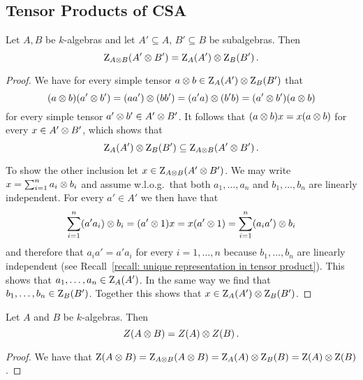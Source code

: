 \subsection{Tensor Products of CSA}


\begin{lemma}
  \label{lemma: centralizer componentwise}
  Let $A, B$ be $k$-algebras and let $A' \subseteq A$, $B' \subseteq B$ be subalgebras.
  Then
  \[
      \operatorname{Z}_{A \mathbin{\otimes} B}(A' \mathbin{\otimes} B')
    = \operatorname{Z}_A(A') \mathbin{\otimes} \operatorname{Z}_B(B') \,.
  \]
\end{lemma}


\begin{proof}
  We have for every simple tensor $a \mathbin{\otimes} b \in \operatorname{Z}_A(A') \mathbin{\otimes} \operatorname{Z}_B(B')$ that
  \[
      (a \mathbin{\otimes} b) (a' \mathbin{\otimes} b')
    = (aa') \mathbin{\otimes} (bb')
    = (a'a) \mathbin{\otimes} (b'b)
    = (a' \mathbin{\otimes} b')(a \mathbin{\otimes} b)
  \]
  for every simple tensor $a' \mathbin{\otimes} b' \in A' \mathbin{\otimes} B'$.
  It follows that $(a \mathbin{\otimes} b) x = x (a \mathbin{\otimes} b)$ for every $x \in A' \mathbin{\otimes} B'$, which shows that
  \[
              \operatorname{Z}_A(A') \mathbin{\otimes} \operatorname{Z}_B(B')
    \subseteq \operatorname{Z}_{A \mathbin{\otimes} B}(A' \mathbin{\otimes} B') \,.
  \]
  
  To show the other inclusion let $x \in \operatorname{Z}_{A \mathbin{\otimes} B}(A' \mathbin{\otimes} B')$.
  We may write $x = \sum_{i=1}^n a_i \mathbin{\otimes} b_i$ and assume w.l.o.g.\ that both $a_1, \dotsc, a_n$ and $b_1, \dotsc, b_n$ are linearly independent.
  For every $a' \in A'$ we then have that
  \[
      \sum_{i=1}^n (a' a_i) \mathbin{\otimes} b_i
    = (a' \mathbin{\otimes} 1) x
    = x (a' \mathbin{\otimes} 1)
    = \sum_{i=1}^n (a_i a') \mathbin{\otimes} b_i
  \]
  and therefore that $a_i a' = a' a_i$ for every $i = 1, \dotsc, n$ because $b_1, \dotsc, b_n$ are linearly independent (see Recall~\ref{recall: unique representation in tensor product}).
  This shows that $a_1, \dotsc, a_n \in \operatorname{Z}_{A}(A')$.
  In the same way we find that $b_1, \dotsc, b_n \in \operatorname{Z}_{B}(B')$.
  Together this shows that $x \in \operatorname{Z}_A(A') \mathbin{\otimes} \operatorname{Z}_B(B')$.
\end{proof}


\begin{corollary}
  \label{corollary: center of tensor product}
  Let $A$ and $B$ be $k$-algebras.
  Then
  \[
      Z(A \mathbin{\otimes} B)
    = Z(A) \mathbin{\otimes} Z(B) \,.
  \]
\end{corollary}


\begin{proof}
  We have that
  $
      \operatorname{Z}(A \mathbin{\otimes} B)
    = \operatorname{Z}_{A \mathbin{\otimes} B}(A \mathbin{\otimes} B)
    = \operatorname{Z}_A(A) \mathbin{\otimes} \operatorname{Z}_B(B)
    = \operatorname{Z}(A) \mathbin{\otimes} \operatorname{Z}(B)
  $.
\end{proof}


